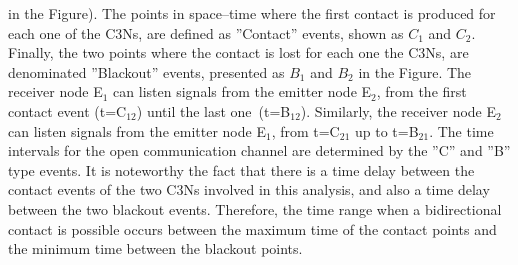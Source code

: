 \documentclass[crop]{CSLB}
\newcommand{\cetis}{C3Ns}
\begin{document}
in the Figure).
%
The points in space--time where the first contact is produced for each
one of the \cetis{}, are defined as ''Contact'' events, shown as $C_1$
and $C_2$.
%
Finally, the two points where the contact is lost for each one the
\cetis{}, are denominated ''Blackout'' events, presented as $B_1$ and
$B_2$ in the Figure.
%
The receiver node E$_1$ can listen signals from the emitter node
E$_2$, from the first contact event (t=C$_{12}$) until the last
one (t=B$_{12}$).
%
Similarly, the receiver node E$_2$ can listen signals from the emitter
node E$_1$, from t=C$_{21}$ up to t=B$_{21}$.
%
The time intervals for the open communication channel are determined
by the ''C'' and ''B'' type events.
%
It is noteworthy the fact that there is a time delay between the
contact events of the two \cetis{} involved in this analysis, and also
a time delay between the two blackout events.
%
Therefore, the time range when a bidirectional contact is possible
occurs between the maximum time of the contact points and the minimum
time between the blackout points.
\end{document}
